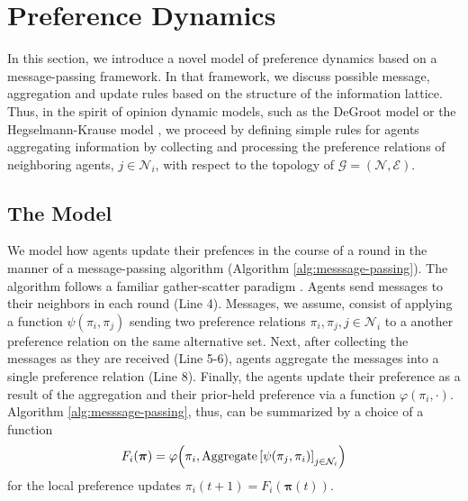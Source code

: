 \documentclass[conference]{ieeeconf}
\newcommand{\N}{\mathcal{N}}
\newcommand{\G}{\mathcal{G}}
\newcommand{\E}{\mathcal{E}}
\newcommand{\profile}{\boldsymbol{\pi}}
\DeclareMathOperator{\Aggregate}{Aggregate}
\begin{document}
\section{Preference Dynamics}
\label{sec:dynamics}

In this section, we introduce a novel model of preference dynamics based on a message-passing framework. In that framework, we discuss possible message, aggregation and update rules based on the structure of the information lattice. Thus, in the spirit of opinion dynamic models, such as the DeGroot model \cite{degroot1974} or the Hegselmann-Krause model \cite{hegselmann2002}, we proceed by defining simple rules for agents aggregating information by collecting and processing the preference relations of neighboring agents, $j \in \N_i$, with respect to the topology of $\G = (\N,\E)$.

\subsection{The Model}

We model how agents update their prefences in the course of a round in the manner of a message-passing algorithm (Algorithm \ref{alg:messsage-passing}). The algorithm follows a familiar gather-scatter paradigm \cite{dudzik}. Agents send messages to their neighbors in each round (Line 4). Messages, we assume, consist of applying a function $\psi(\pi_i,\pi_j)$ sending two preference relations $\pi_i, \pi_j, j \in \N_i$ to a another preference relation on the same alternative set.
Next, after collecting the messages as they are received (Line 5-6), agents aggregate the messages into a single preference relation (Line 8). Finally, the agents update their preference as a result of the aggregation and their prior-held preference via a function  $\varphi(\pi_i,\cdot)$. Algorithm \ref{alg:messsage-passing}, thus, can be summarized by a choice of a function
\begin{align}
    F_i(\profile) = \varphi\Bigl(\pi_i, \Aggregate{\left[ \psi(\pi_j, \pi_i)\right]_{j \in \N_i}} \Bigr) \label{eq:message-passing}
\end{align}
for the local preference updates $\pi_i(t+1) = F_i\left( \profile(t) \right)$.
\end{document}

